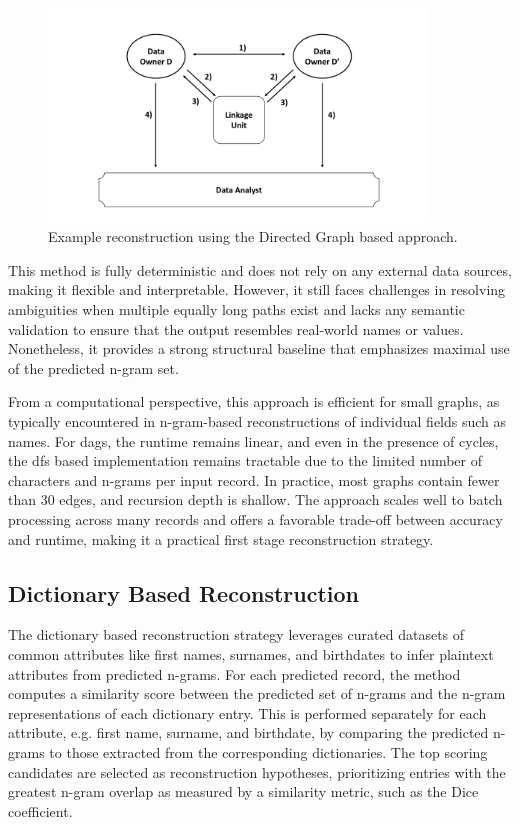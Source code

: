 \begin{figure}[H]
\centering
\includegraphics[width=0.9\textwidth, page=18]{img/visualization.pdf}
\caption{Example reconstruction using the Directed Graph based approach.}
\label{fig:graphreconstruction}
\end{figure}

This method is fully deterministic and does not rely on any external data sources, making it flexible and interpretable.
However, it still faces challenges in resolving ambiguities when multiple equally long paths exist and lacks any semantic validation to ensure that the output resembles real-world names or values.
Nonetheless, it provides a strong structural baseline that emphasizes maximal use of the predicted n-gram set.

From a computational perspective, this approach is efficient for small graphs, as typically encountered in n-gram-based reconstructions of individual fields such as names.
For \ac{dag}s, the runtime remains linear, and even in the presence of cycles, the \ac{dfs} based implementation remains tractable due to the limited number of characters and n-grams per input record.
In practice, most graphs contain fewer than 30 edges, and recursion depth is shallow.
The approach scales well to batch processing across many records and offers a favorable trade-off between accuracy and runtime, making it a practical first stage reconstruction strategy.

\subsection{Dictionary Based Reconstruction} \label{sec:dictrecon}

The dictionary based reconstruction strategy leverages curated datasets of common attributes like first names, surnames, and birthdates to infer plaintext attributes from predicted n-grams.
For each predicted record, the method computes a similarity score between the predicted set of n-grams and the n-gram representations of each dictionary entry.
This is performed separately for each attribute, e.g. first name, surname, and birthdate, by comparing the predicted n-grams to those extracted from the corresponding dictionaries.
The top scoring candidates are selected as reconstruction hypotheses, prioritizing entries with the greatest n-gram overlap as measured by a similarity metric, such as the Dice coefficient.

